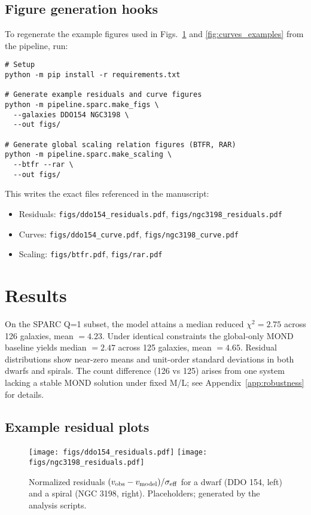 \documentclass[twocolumn,prd,amsmath,amssymb,aps,superscriptaddress,nofootinbib]{revtex4-2}
\begin{document}
\subsection{Figure generation hooks}
To regenerate the example figures used in Figs.~\ref{fig:residuals_examples} and \ref{fig:curves_examples} from the pipeline, run:
\begin{verbatim}
# Setup
python -m pip install -r requirements.txt

# Generate example residuals and curve figures
python -m pipeline.sparc.make_figs \
  --galaxies DDO154 NGC3198 \
  --out figs/

# Generate global scaling relation figures (BTFR, RAR)
python -m pipeline.sparc.make_scaling \
  --btfr --rar \
  --out figs/
\end{verbatim}
This writes the exact files referenced in the manuscript:
\begin{itemize}
  \item Residuals: \texttt{figs/ddo154\_residuals.pdf}, \texttt{figs/ngc3198\_residuals.pdf}
  \item Curves: \texttt{figs/ddo154\_curve.pdf}, \texttt{figs/ngc3198\_curve.pdf}
  \item Scaling: \texttt{figs/btfr.pdf}, \texttt{figs/rar.pdf}
\end{itemize}

\section{Results}
On the SPARC Q=1 subset, the model attains a median reduced $\chi^2 = 2.75$ across 126 galaxies, mean $=4.23$. Under identical constraints the global-only MOND baseline yields median $=2.47$ across 125 galaxies, mean $=4.65$. Residual distributions show near-zero means and unit-order standard deviations in both dwarfs and spirals. The count difference (126 vs 125) arises from one system lacking a stable MOND solution under fixed M/L; see Appendix~\ref{app:robustness} for details.

\subsection*{Example residual plots}
\begin{figure}[h]
  \centering
  \texttt{[image: figs/ddo154\_residuals.pdf]}\hfill
  \texttt{[image: figs/ngc3198\_residuals.pdf]}
  \caption{Normalized residuals $(v_{\rm obs} - v_{\rm model})/\sigma_{\rm eff}$ for a dwarf (DDO 154, left) and a spiral (NGC 3198, right). Placeholders; generated by the analysis scripts.}
  \label{fig:residuals_examples}
\end{figure}
\end{document}
